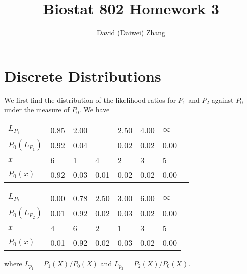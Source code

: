 \documentclass[12pt]{article}
\title{Biostat 802 Homework 3}
\author{David (Daiwei) Zhang}
\begin{document}
\maketitle

\section{Discrete Distributions}

We first find the distribution of the likelihood ratios
for $P_1$ and $P_2$ against $P_0$
under the measure of $P_0$.
We have
\begin{center}
  \begin{tabular}{|l|l|l l|l|l|l|l}
    \hline
    $L_{P_1}$ & 0.85 & 2.00 && 2.50 & 4.00 & $\infty$ \\
    $P_0(L_{P_1})$ & 0.92 & 0.04 && 0.02 & 0.02 & 0.00 \\
    \hline
    $x$ & 6 & 1 & 4 & 2 & 3 & 5 \\
    $P_0(x)$ & 0.92 & 0.03 & 0.01 & 0.02 & 0.02 & 0.00 \\
    \hline
  \end{tabular}
\end{center}
\begin{center}
  \begin{tabular}{|l|l|l|l|l|l|l|}
    \hline
    $L_{P_2}$ & 0.00 & 0.78 & 2.50 & 3.00 & 6.00 & $\infty$ \\
    $P_0(L_{P_2})$ & 0.01 & 0.92 & 0.02 & 0.03 & 0.02 & 0.00 \\
    \hline
    $x$ & 4 & 6 & 2 & 1 & 3 & 5 \\
    $P_0(x)$ & 0.01 & 0.92 & 0.02 & 0.03 & 0.02 & 0.00 \\
    \hline
  \end{tabular}
\end{center}
where $L_{p_1} = P_1(X) / P_0(X)$ and $L_{p_2} = P_2(X) / P_0(X)$.
\end{document}
